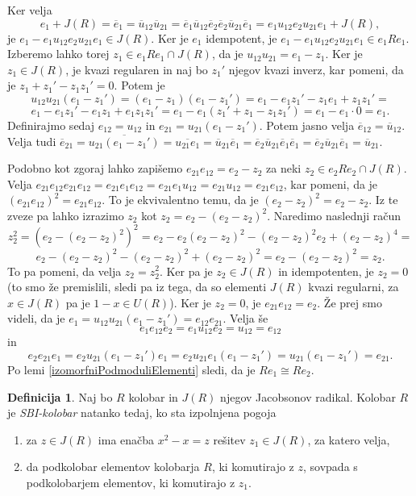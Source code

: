 \documentclass[a4paper, 12pt]{amsart}
\theoremstyle{definition} %
\newtheorem{definicija}{Definicija}[section]
\theoremstyle{plain} %
\begin{document}
Ker velja 
$$
e_1 + J(R) = \overline{e}_1 = \overline{u}_{12} \overline{u}_{21} = \overline{e}_1 \overline{u}_{12} \overline{e}_2 \overline{e}_2 \overline{u}_{21} \overline{e}_1 = e_1 u_{12} e_2 u_{21} e_1 + J(R),
$$
je $e_1 - e_1 u_{12} e_2 u_{21} e_1 \in J(R)$. Ker je $e_1$ idempotent, je  $e_1 - e_1 u_{12} e_2 u_{21} e_1 \in e_1 R e_1$. Izberemo lahko torej $z_1 \in e_1Re_1 \cap J(R)$, da je $u_{12}u_{21} = e_1 - z_1$. Ker je $z_1\in J(R)$, je kvazi regularen in naj bo $z_1'$ njegov kvazi inverz, kar pomeni, da je $z_1 + z_1' - z_1 z_1' = 0$. Potem je 
$$
u_{12} u_{21} (e_1 - z_1') = (e_1 - z_1)(e_1 - z_1') = e_1 - e_1 z_1' - z_1 e_1 + z_1 z_1' = 
$$
$$
e_1 - e_1 z_1' - e_1 z_1 + e_1 z_1 z_1' = e_1 - e_1 (z_1' +z_1 - z_1 z_1') = e_1  - e_1 \cdot 0 = e_1.
$$
Definirajmo sedaj $e_{12} = u_{12} $ in $e_{21} = u_{21} (e_1 - z_1')$. Potem jasno velja $\overline{e}_{12} = \overline{u}_{12}$. Velja tudi $\overline{e}_{21} = \overline{u_{21}(e_1 - z_1')} = \overline{u_{21} e_1} = \overline{u}_{21} \overline{e}_1 = \overline{e}_2 \overline{u}_{21} \overline{e}_1 \overline{e}_1 =  \overline{e}_2 \overline{u}_{21} \overline{e}_1 = \overline{u}_{21}$.

Podobno kot zgoraj lahko zapišemo $e_{21} e_{12} = e_2 - z_2 $ za neki $z_2 \in e_2 Re_2 \cap J(R)$. Velja $e_{21}e_{12}e_{21}e_{12} = e_{21} e_1 e_{12} = e_{21} e_1 u_{12} = e_{21} u_{12} = e_{21} e_{12}$, kar pomeni, da je $(e_{21} e_{12})^2 = e_{21} e_{12}$. To je ekvivalentno temu, da je $(e_2 - z_2 )^2 = e_2 - z_2$. Iz te zveze pa lahko izrazimo $z_2$ kot $z_2 = e_2 - (e_2 - z_2)^2$. Naredimo naslednji račun
$$
z_2^2 = (e_2 - (e_2 - z_2)^2)^2 = e_2 - e_2(e_2-z_2)^2 - (e_2 - z_2 )^2 e_2 + (e_2 - z_2 )^4 = 
$$
$$
e_2 - (e_2 - z_2 )^2 - (e_2 - z_2)^2 + (e_2 - z_2)^2 = e_2 - (e_2 - z_2)^2 = z_2.
$$
To pa pomeni, da velja $z_2 = z_2^2$. Ker pa je $z_2\in J(R)$ in idempotenten, je $z_2 = 0$ (to smo že premislili, sledi pa iz tega, da so elementi $J(R)$ kvazi regularni, za $x\in J(R)$ pa je $1-x\in U(R)$). Ker je $z_2 = 0$, je $e_{21} e_{12} = e_2$. Že prej smo videli, da je $e_1 = u_{12}u_{21}(e_1 - z_1') = e_{12} e_{21}$. Velja še 
$$
e_1 e_{12}e_2 = e_1 u_{12} e_2 = u_{12} = e_{12}
$$
in
$$
e_2 e_{21} e_1 = e_2 u_{21}(e_1 - z_1') e_1 = e_2 u_{21} e_1 (e_1 - z_1') = u_{21}(e_1 - z_1') = e_{21}.
$$
Po lemi \ref{izomorfniPodmoduliElementi} sledi, da je $Re_1 \cong Re_2$.

\endproof

\begin{definicija}
\label{SBI-kolobar}
Naj bo $R$ kolobar in $J(R)$ njegov Jacobsonov radikal. Kolobar $R$ je \emph{SBI-kolobar} natanko tedaj, ko sta izpolnjena pogoja
\begin{enumerate}
\item za $z\in J(R)$ ima enačba $x^2 - x = z$ rešitev $z_1 \in J(R)$, za katero velja, 
\item da podkolobar elementov kolobarja $R$, ki komutirajo z $z$, sovpada s podkolobarjem elementov, ki komutirajo z $z_1$.  
\end{enumerate}
\end{definicija}
\end{document}
